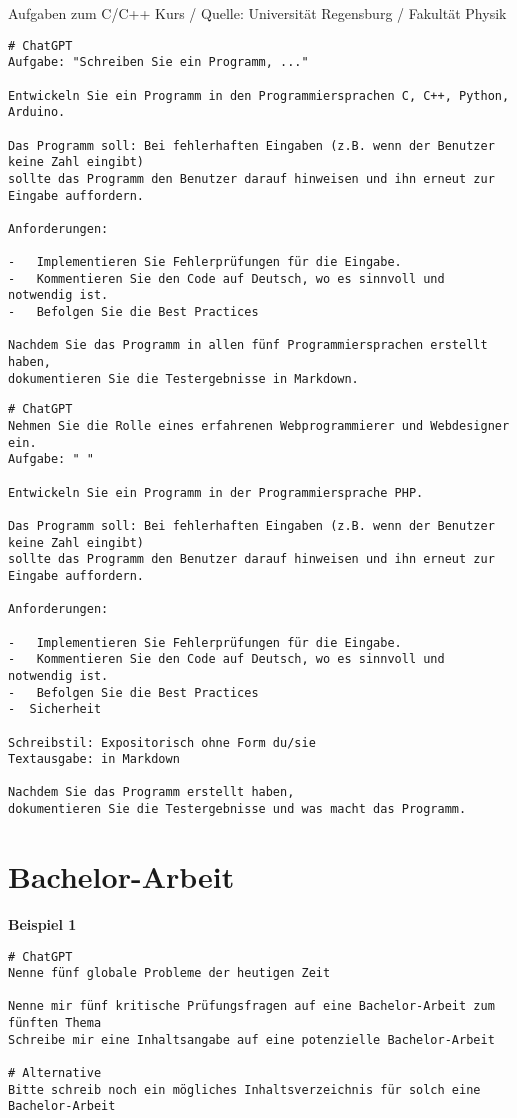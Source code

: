 \documentclass[12pt,a4paper]{scrartcl}
\begin{document}
Aufgaben zum C/C++ Kurs / Quelle: Universität Regensburg / Fakultät
Physik

\begin{lstlisting}
# ChatGPT
Aufgabe: "Schreiben Sie ein Programm, ..."

Entwickeln Sie ein Programm in den Programmiersprachen C, C++, Python, Arduino. 

Das Programm soll: Bei fehlerhaften Eingaben (z.B. wenn der Benutzer keine Zahl eingibt) 
sollte das Programm den Benutzer darauf hinweisen und ihn erneut zur Eingabe auffordern.

Anforderungen:

-   Implementieren Sie Fehlerprüfungen für die Eingabe.
-   Kommentieren Sie den Code auf Deutsch, wo es sinnvoll und notwendig ist.
-   Befolgen Sie die Best Practices

Nachdem Sie das Programm in allen fünf Programmiersprachen erstellt haben, 
dokumentieren Sie die Testergebnisse in Markdown.
\end{lstlisting}

\begin{lstlisting}
# ChatGPT
Nehmen Sie die Rolle eines erfahrenen Webprogrammierer und Webdesigner ein.
Aufgabe: " "

Entwickeln Sie ein Programm in der Programmiersprache PHP. 

Das Programm soll: Bei fehlerhaften Eingaben (z.B. wenn der Benutzer keine Zahl eingibt) 
sollte das Programm den Benutzer darauf hinweisen und ihn erneut zur Eingabe auffordern.

Anforderungen:

-   Implementieren Sie Fehlerprüfungen für die Eingabe.
-   Kommentieren Sie den Code auf Deutsch, wo es sinnvoll und notwendig ist.
-   Befolgen Sie die Best Practices
-  Sicherheit

Schreibstil: Expositorisch ohne Form du/sie
Textausgabe: in Markdown

Nachdem Sie das Programm erstellt haben, 
dokumentieren Sie die Testergebnisse und was macht das Programm.
\end{lstlisting}

\hypertarget{bachelor-arbeit}{%
\section{Bachelor-Arbeit}\label{bachelor-arbeit}}

\textbf{Beispiel 1}

\begin{lstlisting}
# ChatGPT
Nenne fünf globale Probleme der heutigen Zeit

Nenne mir fünf kritische Prüfungsfragen auf eine Bachelor-Arbeit zum fünften Thema
Schreibe mir eine Inhaltsangabe auf eine potenzielle Bachelor-Arbeit

# Alternative
Bitte schreib noch ein mögliches Inhaltsverzeichnis für solch eine Bachelor-Arbeit
\end{lstlisting}
\end{document}
